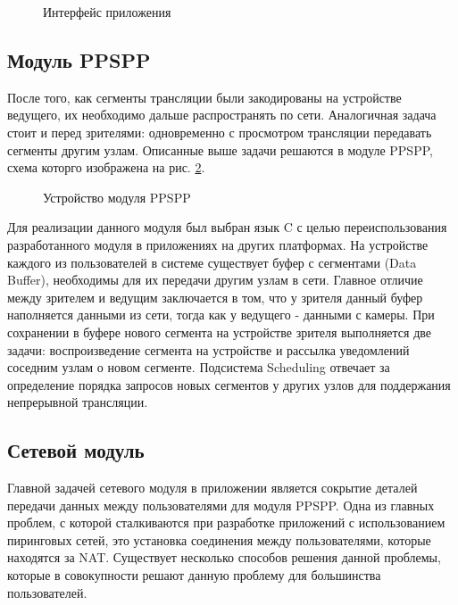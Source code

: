 			\begin{figure}[h]
				\caption{Интерфейс приложения}
				\label{img:interface}
			\end{figure}

		\subsection{Модуль PPSPP}
		После того, как сегменты трансляции были закодированы на устройстве ведущего, их необходимо дальше
		распространять по сети. Аналогичная задача стоит и перед зрителями: одновременно с просмотром трансляции
		передавать сегменты другим узлам. Описанные выше задачи решаются в модуле PPSPP, схема которго изображена на
		рис. \ref{img:ppspp-architecture}.

		\begin{figure}[H]
			\caption{Устройство модуля PPSPP}
			\label{img:ppspp-architecture}
		\end{figure}

		Для реализации данного модуля был выбран язык C с целью переиспользования
		разработанного модуля в приложениях на других платформах. На устройстве каждого из пользователей в системе
		существует буфер с сегментами (Data Buffer), необходимы для их передачи другим узлам в сети. Главное
		отличие между зрителем и ведущим заключается в том, что у зрителя данный буфер наполняется данными из сети,
		тогда как у ведущего - данными с камеры. При сохранении в буфере нового сегмента на устройстве зрителя
		выполняется две задачи: воспроизведение сегмента на устройстве и рассылка уведомлений соседним узлам о новом
		сегменте. Подсистема Scheduling отвечает за определение порядка запросов новых сегментов у других узлов
		для поддержания непрерывной трансляции.

		\subsection{Сетевой модуль}
		Главной задачей сетевого модуля в приложении является сокрытие деталей передачи данных между пользователями для
		модуля PPSPP. Одна из главных проблем, с которой сталкиваются при разработке приложений с использованием
		пиринговых сетей, это установка соединения между пользователями, которые находятся за NAT. Существует несколько
		способов решения данной проблемы, которые в совокупности решают данную проблему для большинства пользователей.


